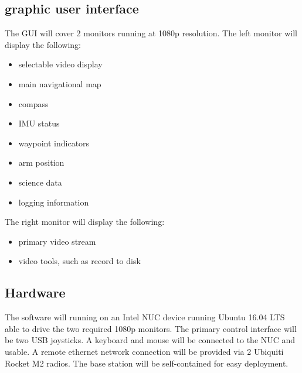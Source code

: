\documentclass[onecolumn, draftclsnofoot, 10pt, compsoc]{IEEEtran}
\begin{document}
\subsection{graphic user interface}
	The GUI will cover 2 monitors running at 1080p resolution.
	The left monitor will display the following: \begin{itemize}
														 \item selectable video display
														 \item main navigational map
														 \item compass
														 \item IMU status
														 \item waypoint indicators
														 \item arm position
														 \item science data
														 \item logging information
\end{itemize}

	The right monitor will display the following: \begin{itemize}
													  \item primary video stream
													  \item video tools, such as record to disk
\end{itemize}
\subsection{Hardware}
	The software will running on an Intel NUC device running Ubuntu 16.04 LTS able to drive the two required 1080p monitors.
	The primary control interface will be two USB joysticks.
	A keyboard and mouse will be connected to the NUC and usable.
	A remote ethernet network connection will be provided via 2 Ubiquiti Rocket M2 radios.
	The base station will be self-contained for easy deployment.
\end{document}
